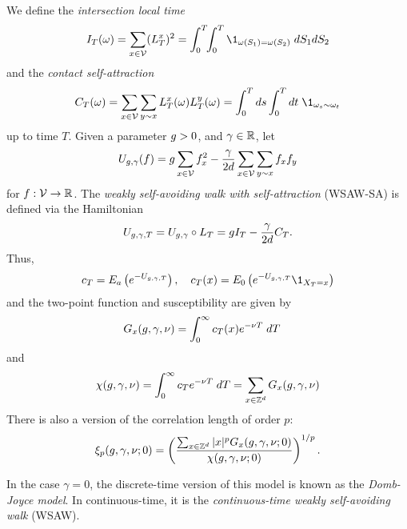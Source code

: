 We define the \emph{intersection local time}
\begin{equation}
\label{e:ITdef}
I_T(\omega) = \sum_{x\in\vertices} (\lt^x_T)^2
  =
\int_0^T \!\! \int_0^T \1_{\omega(S_1)=\omega(S_2)} \; dS_1 dS_2
\end{equation}
and the \emph{contact self-attraction}
\begin{equation}
\label{e:CTdef}
C_T(\omega)
	=
\sum_{x \in \vertices} \sum_{y \sim x} \lt_T^x(\omega) \lt_T^y(\omega)
	=
\int_0^T ds \int_0^T dt \; \1_{\omega_s \sim \omega_t}
\end{equation}
up to time $T$.
Given a parameter $g > 0$, and $\gamma \in {\mathbb R}$, let
\begin{equation}
\label{e:Udef-neg}
U_{g,\gamma}(f)
=
g \sum_{x\in\mathcal{V}} f_x^2
- \frac{\gamma}{2d}
\sum_{x\in\mathcal{V}} \sum_{y \sim x} f_x f_y
\end{equation}
for $f : \mathcal{V} \rightarrow {\mathbb R}$.
The \emph{weakly self-avoiding walk with self-attraction} (WSAW-SA) is defined via the Hamiltonian
\begin{equation}
\label{e:V}
U_{g,\gamma,T}
	= U_{g,\gamma} \circ L_T
	= g I_T - \frac{\gamma}{2 d} C_T.
\end{equation}
Thus,
\begin{equation}
\label{e:c}
    c_T = E_a\left(e^{-U_{\gcc,\gamma,T}}\right),
    \quad
    c_T(x) = E_0\left(e^{-U_{\gcc,\gamma,T}}\1_{X_T = x}\right)
\end{equation}
and the two-point function and susceptibility are given by
\begin{align}
\lbeq{Gsa}
G_x(\gcc,\gamma,\nu)
    &=
\int_0^\infty c_T(x) e^{-\nu T} \; dT
\end{align}
and
\begin{equation}
\label{e:suscept-def}
\chi(g, \gamma, \nu)
	=
\int_0^\infty c_T e^{-\nu T} \; dT
	=
\sum_{x\in{ {{\mathbb Z}}^d }} G_x(g,\gamma,\nu)
\end{equation}
There is also a version of the correlation length of order $p$:
\begin{equation}
\label{e:clp-wsawsa}
\xi_p(g, \gamma, \nu; 0)
	=
\left(\frac{\sum_{x\in{ {{\mathbb Z}}^d }} |x|^p G_x(g, \gamma, \nu; 0)}{\chi(g, \gamma, \nu; 0)}\right)^{1/p}.
\end{equation}

In the case $\gamma = 0$, the discrete-time version of this model is known as
the \emph{Domb-Joyce model}. In continuous-time, it is the
\emph{continuous-time weakly self-avoiding walk} (WSAW).

